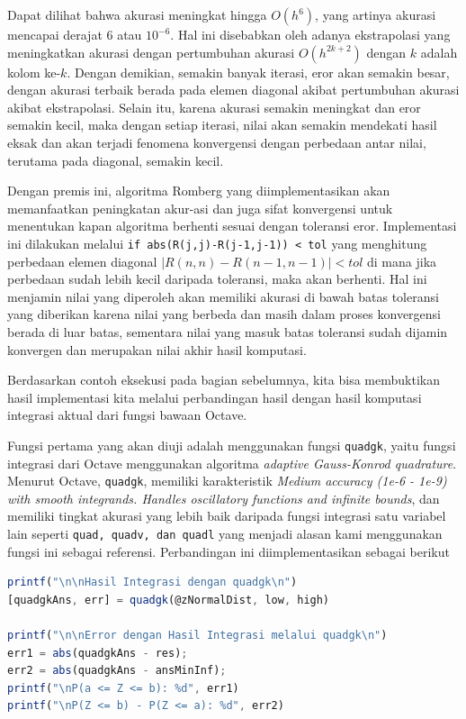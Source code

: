 \documentclass[journal,12pt,onecolumn,a4paper]{IEEEtran}
\begin{document}
Dapat dilihat bahwa akurasi meningkat hingga \(O(h^6)\), yang artinya akurasi mencapai derajat 6 atau \(10^{-6}\). Hal ini disebabkan oleh adanya ekstrapolasi yang meningkatkan akurasi dengan pertumbuhan akurasi \(O(h^{2k+2})\) dengan \(k\) adalah kolom ke-\(k\). Dengan demikian, semakin banyak iterasi, eror akan semakin besar, dengan akurasi terbaik berada pada elemen diagonal akibat pertumbuhan akurasi akibat ekstrapolasi.
Selain itu, karena akurasi semakin meningkat dan eror semakin kecil, maka dengan setiap iterasi, nilai akan semakin mendekati hasil eksak dan akan terjadi fenomena konvergensi dengan perbedaan antar nilai, terutama pada diagonal, semakin kecil.

Dengan premis ini, algoritma Romberg yang diimplementasikan akan memanfaatkan peningkatan akur\hyp{}asi dan juga sifat konvergensi untuk menentukan kapan algoritma berhenti sesuai dengan toleransi eror. Implementasi ini dilakukan melalui \lstinline{if abs(R(j,j)-R(j-1,j-1)) < tol} yang menghitung perbedaan elemen diagonal \(|R(n,n)-R(n-1,n-1)| < tol\) di mana jika perbedaan sudah lebih kecil daripada toleransi, maka akan berhenti.
Hal ini menjamin nilai yang diperoleh akan memiliki akurasi di bawah batas toleransi yang diberikan karena nilai yang berbeda dan masih dalam proses konvergensi berada di luar batas, sementara nilai yang masuk batas toleransi sudah dijamin konvergen dan merupakan nilai akhir hasil komputasi.

Berdasarkan contoh eksekusi pada bagian sebelumnya, kita bisa membuktikan hasil implementasi kita melalui perbandingan hasil dengan hasil komputasi integrasi aktual dari fungsi bawaan Octave.

Fungsi pertama yang akan diuji adalah menggunakan fungsi \lstinline{quadgk}, yaitu fungsi integrasi dari Octave menggunakan algoritma \emph{adaptive Gauss-Konrod quadrature}. Menurut Octave, \lstinline{quadgk}, memiliki karakteristik \emph{Medium accuracy (1e-6 - 1e-9) with smooth integrands. Handles oscillatory functions and infinite bounds}, dan memiliki tingkat akurasi yang lebih baik daripada fungsi integrasi satu variabel lain seperti \lstinline{quad, quadv, dan quadl} yang menjadi alasan kami menggunakan fungsi ini sebagai referensi.
Perbandingan ini diimplementasikan sebagai berikut

\begin{center}
	\begin{lstlisting}[language=Octave]
printf("\n\nHasil Integrasi dengan quadgk\n")
[quadgkAns, err] = quadgk(@zNormalDist, low, high)

printf("\n\nError dengan Hasil Integrasi melalui quadgk\n")
err1 = abs(quadgkAns - res);
err2 = abs(quadgkAns - ansMinInf);
printf("\nP(a <= Z <= b): %d", err1)
printf("\nP(Z <= b) - P(Z <= a): %d", err2)
	\end{lstlisting}
\end{center}
\end{document}
